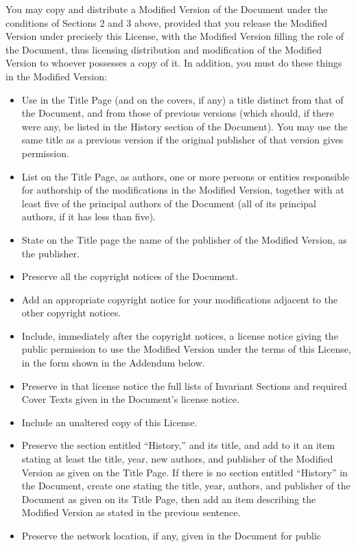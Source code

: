 You may copy and distribute a Modified Version of the Document under
the conditions of Sections 2 and 3 above, provided that you release
the Modified Version under precisely this License, with the Modified
Version filling the role of the Document, thus licensing distribution
and modification of the Modified Version to whoever possesses a copy
of it. In addition, you must do these things in the Modified Version:
\begin{itemize}
\item Use in the Title Page (and on the covers, if any) a title distinct
from that of the Document, and from those of previous versions (which
should, if there were any, be listed in the History section of the
Document). You may use the same title as a previous version if the
original publisher of that version gives permission. 
\item List on the Title Page, as authors, one or more persons or entities
responsible for authorship of the modifications in the Modified Version,
together with at least five of the principal authors of the Document
(all of its principal authors, if it has less than five). 
\item State on the Title page the name of the publisher of the Modified
Version, as the publisher. 
\item Preserve all the copyright notices of the Document. 
\item Add an appropriate copyright notice for your modifications adjacent
to the other copyright notices. 
\item Include, immediately after the copyright notices, a license notice
giving the public permission to use the Modified Version under the
terms of this License, in the form shown in the Addendum below. 
\item Preserve in that license notice the full lists of Invariant Sections
and required Cover Texts given in the Document's license notice. 
\item Include an unaltered copy of this License. 
\item Preserve the section entitled ``History,'' and its title, and add
to it an item stating at least the title, year, new authors, and publisher
of the Modified Version as given on the Title Page. If there is no
section entitled ``History'' in the Document, create one stating
the title, year, authors, and publisher of the Document as given on
its Title Page, then add an item describing the Modified Version as
stated in the previous sentence. 
\item Preserve the network location, if any, given in the Document for public

\end{itemize}
